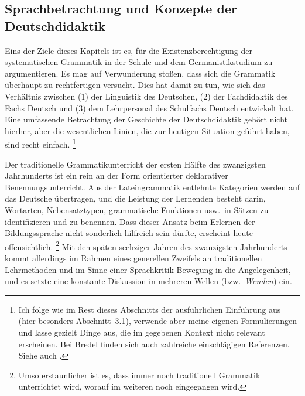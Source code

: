 \subsection{Sprachbetrachtung und Konzepte der Deutschdidaktik}
\label{sec:sprachbetrachtungundkonzeptederdeutschdidaktik}

Eins der Ziele dieses Kapitels ist es, für die Existenzberechtigung der systematischen Grammatik in der Schule und dem Germanistikstudium zu argumentieren.
Es mag auf Verwunderung stoßen, dass sich die Grammatik überhaupt zu rechtfertigen versucht.
Dies hat damit zu tun, wie sich das Verhältnis zwischen (1) der Linguistik des Deutschen, (2) der Fachdidaktik des Fachs Deutsch und (3) dem Lehrpersonal des Schulfachs Deutsch entwickelt hat.
Eine umfassende Betrachtung der Geschichte der Deutschdidaktik gehört nicht hierher, aber die wesentlichen Linien, die zur heutigen Situation geführt haben, sind recht einfach.%
\footnote{Ich folge wie im Rest dieses Abschnitts der ausführlichen Einführung aus \citet{Bredel2013} (hier besonders Abschnitt~3.1), verwende aber meine eigenen Formulierungen und lasse gezielt Dinge aus, die im gegebenen Kontext nicht relevant erscheinen.
Bei Bredel finden sich auch zahlreiche einschlägigen Referenzen.
Siehe auch \citet{Gornik2003}.}

Der {traditionelle Grammatikunterricht} der ersten Hälfte des zwanzigsten Jahrhunderts ist ein rein an der Form orientierter deklarativer Benennungsunterricht.
Aus der Lateingrammatik entlehnte Kategorien werden auf das Deutsche übertragen, und die Leistung der Lernenden besteht darin, Wortarten, Nebensatztypen, grammatische Funktionen usw.\ in Sätzen zu identifizieren und zu benennen.
Dass dieser Ansatz beim Erlernen der Bildungssprache nicht sonderlich hilfreich sein dürfte, erscheint heute offensichtlich.%
\footnote{Umso erstaunlicher ist es, dass immer noch traditionell Grammatik unterrichtet wird, worauf im weiteren noch eingegangen wird.}
Mit den späten sechziger Jahren des zwanzigsten Jahrhunderts kommt allerdings im Rahmen eines generellen Zweifels an traditionellen Lehrmethoden und im Sinne einer Sprachkritik Bewegung in die Angelegenheit, und es setzte eine konstante Diskussion in mehreren Wellen (bzw.\ \textit{Wenden}) ein.

